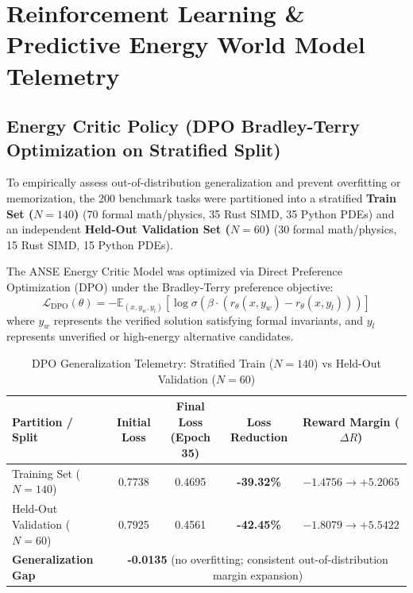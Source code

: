 \section{Reinforcement Learning \& Predictive Energy World Model Telemetry}

\subsection{Energy Critic Policy (DPO Bradley-Terry Optimization on Stratified Split)}
To empirically assess out-of-distribution generalization and prevent overfitting or memorization, the 200 benchmark tasks were partitioned into a stratified \textbf{Train Set ($N = 140$)} (70 formal math/physics, 35 Rust SIMD, 35 Python PDEs) and an independent \textbf{Held-Out Validation Set ($N = 60$)} (30 formal math/physics, 15 Rust SIMD, 15 Python PDEs).

The ANSE Energy Critic Model was optimized via Direct Preference Optimization (DPO) under the Bradley-Terry preference objective:
\begin{equation}
    \mathcal{L}_{\text{DPO}}(\theta) = -\mathbb{E}_{(x, y_w, y_l)} \left[ \log \sigma \left( \beta \cdot (r_\theta(x, y_w) - r_\theta(x, y_l)) \right) \right]
\end{equation}
where $y_w$ represents the verified solution satisfying formal invariants, and $y_l$ represents unverified or high-energy alternative candidates.

\begin{table}[h!]
\centering
\small
\caption{DPO Generalization Telemetry: Stratified Train ($N=140$) vs Held-Out Validation ($N=60$)}
\begin{tabular}{lcccc}
\toprule
\textbf{Partition / Split} & \textbf{Initial Loss} & \textbf{Final Loss (Epoch 35)} & \textbf{Loss Reduction} & \textbf{Reward Margin ($\Delta R$)} \\
\midrule
Training Set ($N = 140$) & 0.7738 & 0.4695 & \textbf{-39.32\%} & $-1.4756 \to +5.2065$ \\
Held-Out Validation ($N = 60$) & 0.7925 & 0.4561 & \textbf{-42.45\%} & $-1.8079 \to +5.5422$ \\
\midrule
\textbf{Generalization Gap} & \multicolumn{4}{c}{\textbf{-0.0135} (no overfitting; consistent out-of-distribution margin expansion)} \\
\bottomrule
\end{tabular}
\end{table}

